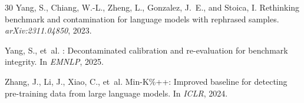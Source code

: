 \documentclass[letterpaper]{article}
\begin{document}
{\begin{thebibliography}{30}
Yang, S., Chiang, W.-L., Zheng, L., Gonzalez, J.~E., and Stoica, I.
\newblock Rethinking benchmark and contamination for language models with rephrased samples.
\newblock \emph{arXiv:2311.04850}, 2023.

Yang, S., et~al.
: Decontaminated calibration and re-evaluation for benchmark integrity.
\newblock In \emph{EMNLP}, 2025.

Zhang, J., Li, J., Xiao, C., et~al.
\newblock Min-{K}\%++: Improved baseline for detecting pre-training data from large language models.
\newblock In \emph{ICLR}, 2024.

\end{thebibliography}
}
\end{document}
